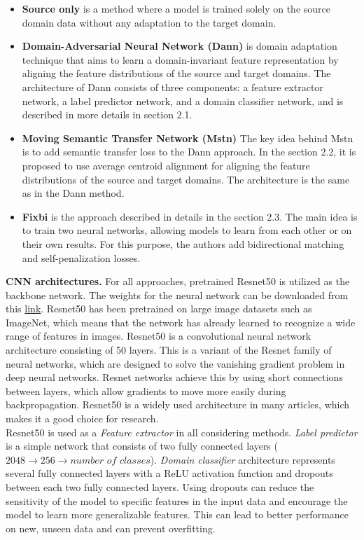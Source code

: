 \begin{itemize}
    \item \textbf{Source only} is a method where a model is trained solely on the source domain data without any adaptation to the target domain.
    \item \textbf{Domain-Adversarial Neural Network (Dann)} is domain adaptation technique that aims to learn a domain-invariant feature representation by aligning the feature distributions of the source and target domains. The architecture of Dann consists of three components: a feature extractor network, a label predictor network, and a domain classifier network, and is described in more details in section 2.1.
    \item \textbf{Moving Semantic Transfer Network (Mstn)} The key idea behind Mstn is to add semantic transfer loss to the Dann approach. In the section 2.2, it is proposed to use average centroid alignment for aligning the feature distributions of the source and target domains. The architecture is the same as in the Dann method. 
    \item  \textbf{Fixbi} is the approach described in details in the section 2.3. The main idea is to train two neural networks, allowing models to learn from each other or on their own results. For this purpose, the authors add bidirectional matching and self-penalization losses.
\end{itemize}

\textbf{CNN architectures.} For all approaches, pretrained Resnet50 \cite{he2016deep} is utilized as the backbone network. The weights for the neural network can be downloaded from this \href{https://download.pytorch.org/models/resnet50-19c8e357.pth}{link}. Resnet50 has been pretrained on large image datasets such as ImageNet, which means that the network has already learned to recognize a wide range of features in images. Resnet50 is a convolutional neural network architecture consisting of 50 layers. This is a variant of the Resnet family of neural networks, which are designed to solve the vanishing gradient problem in deep neural networks. Resnet networks achieve this by using short connections between layers, which allow gradients to move more easily during backpropagation. Resnet50 is a widely used architecture in many articles, which makes it a good choice for research.\\ 

Resnet50 is used as a \textit{Feature extractor} in all considering methods. \textit{Label predictor} is a simple network that consists of two fully connected layers ($2048 \rightarrow 256 \rightarrow \textit{number of classes}$). \textit{Domain classifier} architecture represents several fully connected layers with a ReLU activation function and dropouts between each two fully connected layers. Using dropouts can reduce the sensitivity of the model to specific features in the input data and encourage the model to learn more generalizable features. This can lead to better performance on new, unseen data and can prevent overfitting. \\

